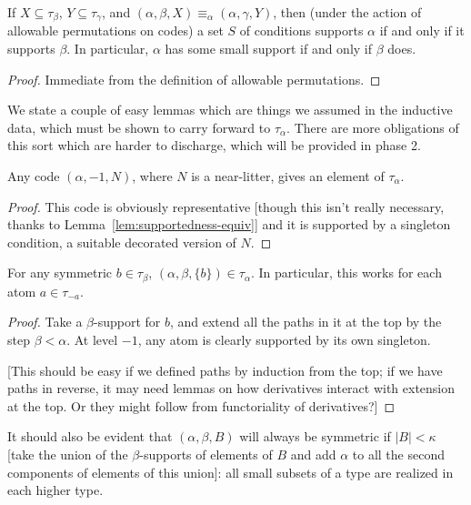 \begin{lemma}
  \label{lem:supportedness-equiv}
  If $X \subseteq \tau_\beta$, $Y \subseteq \tau_\gamma$, and $(\alpha,\beta,X) \equiv_\alpha (\alpha,\gamma,Y)$, then (under the action of allowable permutations on codes) a set $S$ of conditions supports $\alpha$ if and only if it supports $\beta$.  In particular, $\alpha$ has some small support if and only if $\beta$ does.
\end{lemma}

\begin{proof}
  Immediate from the definition of allowable permutations.
\end{proof}

We state a couple of easy lemmas which are things we assumed in the inductive data, which must be shown to carry forward to $\tau_\alpha$.  There are more obligations of this sort which are harder to discharge, which will be provided in phase 2.

\begin{lemma}
\label{def:typed-near-litter}
Any code $(\alpha,-1,N)$, where $N$ is a near-litter, gives an element of $\tau_{\alpha}$.
\end{lemma}

\begin{proof}
This code is obviously representative [though this isn’t really necessary, thanks to Lemma~\ref{lem:supportedness-equiv}] and it is supported by a singleton condition, a suitable decorated version of $N$.
\end{proof}

\begin{lemma}
\label{def:typed-singleton}
For any symmetric $b \in \tau_\beta$, $(\alpha,\beta,\{b\}) \in \tau_\alpha$. In particular, this works for each atom $a \in \tau_{-a}$.
\end{lemma}

\begin{proof}
Take a $\beta$-support for $b$, and extend all the paths in it at the top by the step $\beta < \alpha$.  At level $-1$, any atom is clearly supported by its own singleton.

[This should be easy if we defined paths by induction from the top; if we have paths in reverse, it may need lemmas on how derivatives interact with extension at the top.  Or they might follow from functoriality of derivatives?]
\end{proof}

\begin{lemma}
\label {lem:small-subsets-closure}
It should also be evident that $(\alpha,\beta,B)$ will always be symmetric if $|B|<\kappa$ [take the union of the $\beta$-supports of elements of $B$ and add $\alpha$ to all the second components of elements of this union]:  all small subsets of a type are realized in each higher type.
\end{lemma}

